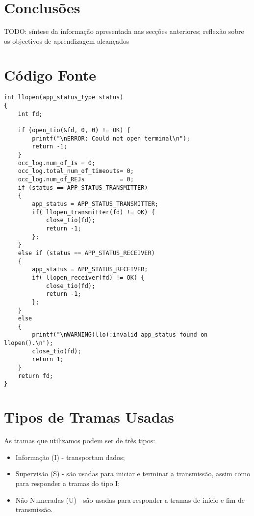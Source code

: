 \documentclass[11pt,a4paper,reqno]{report}
\numberwithin{equation}{section}
\begin{document}
\chapter{Conclusões}

TODO: síntese da informação apresentada nas secções anteriores; reflexão sobre os objectivos de aprendizagem alcançados





\begin{appendices}

\chapter{Código Fonte}

\begin{lstlisting}
int llopen(app_status_type status)
{
	int fd;

	if (open_tio(&fd, 0, 0) != OK) {
		printf("\nERROR: Could not open terminal\n");
		return -1;
	}
	occ_log.num_of_Is = 0;
	occ_log.total_num_of_timeouts= 0;
	occ_log.num_of_REJs			 = 0;
	if (status == APP_STATUS_TRANSMITTER)
	{
		app_status = APP_STATUS_TRANSMITTER;
		if( llopen_transmitter(fd) != OK) {
			close_tio(fd);
			return -1;
		};
	}
	else if (status == APP_STATUS_RECEIVER)
	{
		app_status = APP_STATUS_RECEIVER;
		if( llopen_receiver(fd) != OK) {
			close_tio(fd);
			return -1;
		};
	}
	else
	{
		printf("\nWARNING(llo):invalid app_status found on llopen().\n");
		close_tio(fd);
		return 1;
	}
	return fd;
}
\end{lstlisting}


\chapter{Tipos de Tramas Usadas}
\label{tramas}

As tramas que utilizamos podem ser de três tipos:
\begin{itemize}
	\item Informação (I) - transportam dados;
	\item Supervisão (S) - são usadas para iniciar e terminar a transmissão, assim como para responder a tramas do tipo I;
	\item Não Numeradas (U) - são usadas para responder a tramas de início e fim de transmissão.
\end{itemize}


\end{appendices}
\end{document}
